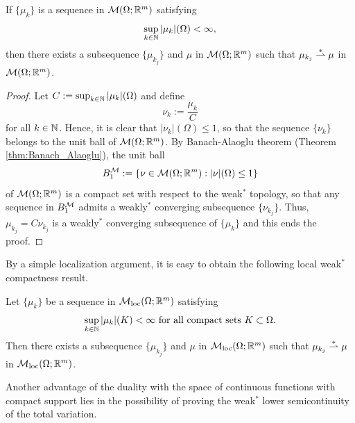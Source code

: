 \begin{theorem} \label{thm:weak_star_compactness}
If $\{\mu_{k}\}$ is a sequence in $\mathcal{M}(\Omega; \mathbb{R}^{m})$ satisfying $$\sup_{k \in \mathbb{N}} |\mu_{k}|(\Omega) < \infty,$$
then there exists a subsequence $\{\mu_{k_{j}}\}$ and $\mu$ in $\mathcal{M}(\Omega; \mathbb{R}^{m})$ such that $\mu_{k_{j}} \overset{*}{\rightharpoonup} \mu$ in $\mathcal{M}(\Omega; \mathbb{R}^{m})$. 
\end{theorem}
\begin{proof}
Let $C := \sup_{k \in \mathbb{N}} |\mu_{k}|(\Omega)$ and define $$\nu_{k} := \frac{\mu_{k}}{C}$$ for all $k \in \mathbb{N}$. Hence, it is clear that $|\nu_{k}|(\Omega) \le 1$, so that the sequence $\{\nu_{k}\}$ belongs to the unit ball of $\mathcal{M}(\Omega; \mathbb{R}^{m})$. By Banach-Alaoglu theorem (Theorem \ref{thm:Banach_Alaoglu}), the unit ball 
\begin{equation*}
B^{\mathcal{M}}_{1} := \{ \nu \in \mathcal{M}(\Omega; \mathbb{R}^{m}) : |\nu|(\Omega) \le 1 \}
\end{equation*}
of $\mathcal{M}(\Omega; \mathbb{R}^{m})$ is a compact set with respect to the weak$^{*}$ topology, so that any sequence in $B_{1}^{\mathcal{M}}$ admits a weakly$^{*}$ converging subsequence $\{\nu_{k_{j}}\}$. Thus, $\mu_{k_{j}} = C \nu_{k_{j}}$ is a weakly$^{*}$ converging subsequence of $\{\mu_{k}\}$ and this ends the proof.
\end{proof}

By a simple localization argument, it is easy to obtain the following local weak$^{*}$ compactness result.

\begin{corollary} \label{cor:loc_weak_star_compactness}
Let $\{\mu_{k}\}$ be a sequence in $\mathcal{M}_{\rm loc}(\Omega; \mathbb{R}^{m})$ satisfying
\begin{equation*}
\sup_{k \in \mathbb{N}} |\mu_{k}|(K) < \infty \text{ for all compact sets } K \subset \Omega.
\end{equation*}
Then there exists a subsequence $\{\mu_{k_{j}}\}$ and $\mu$ in $\mathcal{M}_{\rm loc}(\Omega; \mathbb{R}^{m})$ such that $\mu_{k_{j}} \overset{*}{\rightharpoonup} \mu$ in $\mathcal{M}_{\rm loc}(\Omega; \mathbb{R}^{m})$.  
\end{corollary}

Another advantage of the duality with the space of continuous functions with compact support lies in the possibility of proving the weak$^{*}$ lower semicontinuity of the total variation.

